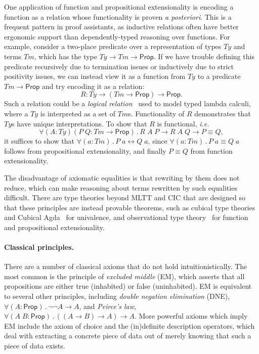 \documentclass{article}
\makeatletter
\newcommand{\ie}{\textit{i.e.}\@\xspace}
\newcommand{\apost}{\textit{a posteriori}\@\xspace}
\newcommand{\kw}[1]{\mathsf{#1}}
\makeatother
\begin{document}
One application of function and propositional extensionality
is encoding a function as a relation whose functionality is proven \apost.
This is a frequent pattern in proof assistants,
as inductive relations often have better ergonomic support
than dependently-typed reasoning over functions.
For example, consider a two-place predicate over
a representation of types $\mathit{Ty}$ and terms $\mathit{Tm}$,
which has the type $\mathit{Ty} \to \mathit{Tm} \to \kw{Prop}$.
If we have trouble defining this predicate recursively due to termination issues
or inductively due to strict positivity issues,
we can instead view it as a function from $\mathit{Ty}$
to a predicate $\mathit{Tm} \to \kw{Prop}$ and try encoding it as a relation:
$$R : \mathit{Ty} \to (\mathit{Tm} \to \kw{Prop}) \to \kw{Prop}.$$
Such a relation could be a \emph{logical relation}~\citep{logrel}
used to model typed lambda calculi,
where a $\mathit{Ty}$ is interpreted as a set of $\mathit{Tm}$s.
Functionality of $R$ demonstrates that $\mathit{Ty}$s have unique interpretations.
To show that $R$ is functional, \ie
$$\forall (A : \mathit{Ty}) (P \; Q : \mathit{Tm} \to \kw{Prop}) \mathpunct{.}
  R \; A \; P \to R \; A \; Q \to P \equiv Q,$$
it suffices to show that
$\forall (a : \mathit{Tm})\mathpunct{.} P \; a \leftrightarrow Q \; a$,
since $\forall (a : \mathit{Tm})\mathpunct{.} P \; a \equiv Q \; a$
follows from propositional extensionality,
and finally $P \equiv Q$ from function extensionality.

The disadvantage of axiomatic equalities is that rewriting by them does not reduce,
which can make reasoning about terms rewritten by such equalities difficult.
There are type theories beyond MLTT and CIC that are designed
so that these principles are instead provable theorems,
such as cubical type theories~\citep{bch,cchm,afh,cartesian}
and Cubical Agda~\citep{cubical-agda} for univalence,
and observational type theory~\citep{ott,ott-now,ttobs,ccobs,cicobs}
for function and propositional extensionality.

\paragraph{Classical principles.}
There are a number of classical axioms that do not hold intuitionistically.
The most common is the principle of \emph{excluded middle} (EM),
which asserts that all propositions are either true (inhabited) or false (uninhabited).
EM is equivalent to several other principles,
including \emph{double negation elimination} (DNE),
$\forall (A : \kw{Prop})\mathpunct{.} \neg \neg A \to A$,
and \emph{Peirce's law},
$\forall (A \; B : \kw{Prop})\mathpunct{.} ((A \to B) \to A) \to A$.
More powerful axioms which imply EM include the axiom of choice
and the (in)definite description operators,
which deal with extracting a concrete piece of data
out of merely knowing that such a piece of data exists.
\end{document}
